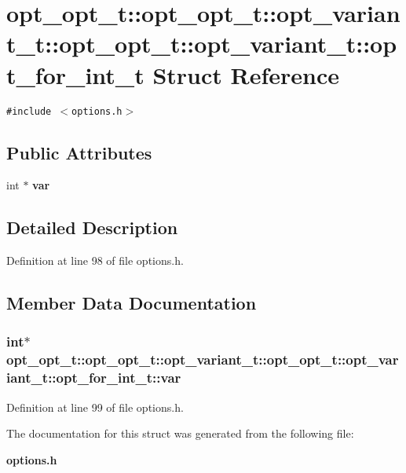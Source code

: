 \section{opt\_\-opt\_\-t::opt\_\-opt\_\-t::opt\_\-variant\_\-t::opt\_\-opt\_\-t::opt\_\-variant\_\-t::opt\_\-for\_\-int\_\-t Struct Reference}
\label{structopt__opt__t_1_1opt__variant__t_1_1opt__for__int__t}
{\tt \#include $<$options.h$>$}

\subsection*{Public Attributes}
\begin{CompactItemize}
\item 
int $\ast$ {\bf var}
\end{CompactItemize}


\subsection{Detailed Description}


Definition at line 98 of file options.h.

\subsection{Member Data Documentation}
\subsubsection[{var}]{\setlength{\rightskip}{0pt plus 5cm}int$\ast$ opt\_\-opt\_\-t::opt\_\-opt\_\-t::opt\_\-variant\_\-t::opt\_\-opt\_\-t::opt\_\-variant\_\-t::opt\_\-for\_\-int\_\-t::var}\label{structopt__opt__t_1_1opt__variant__t_1_1opt__for__int__t_224cab3a6136b78e82c5cec8862f368c}




Definition at line 99 of file options.h.

The documentation for this struct was generated from the following file:\begin{CompactItemize}
\item 
{\bf options.h}\end{CompactItemize}
